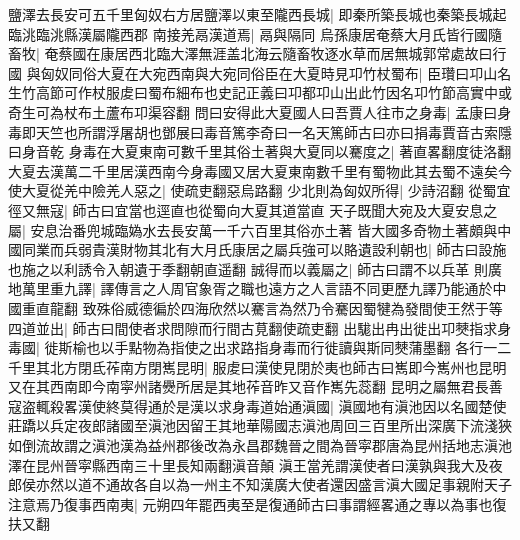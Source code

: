鹽澤去長安可五千里匈奴右方居鹽澤以東至隴西長城|{
	即秦所築長城也秦築長城起臨洮臨洮縣漢屬隴西郡}
南接羌鬲漢道焉|{
	鬲與隔同}
烏孫康居奄蔡大月氏皆行國隨畜牧|{
	奄蔡國在康居西北臨大澤無涯盖北海云隨畜牧逐水草而居無城郭常處故曰行國}
與匈奴同俗大夏在大宛西南與大宛同俗臣在大夏時見卭竹杖蜀布|{
	臣瓚曰卭山名生竹高節可作杖服䖍曰蜀布細布也史記正義曰卭都卭山出此竹因名卭竹節高實中或奇生可為杖布土蘆布卭渠容翻}
問曰安得此大夏國人曰吾賈人往市之身毒|{
	孟康曰身毒即天竺也所謂浮屠胡也鄧展曰毒音篤李奇曰一名天篤師古曰亦曰捐毒賈音古索隱曰身音乾}
身毒在大夏東南可數千里其俗土著與大夏同以騫度之|{
	著直畧翻度徒洛翻}
大夏去漢萬二千里居漢西南今身毒國又居大夏東南數千里有蜀物此其去蜀不遠矣今使大夏從羌中險羌人惡之|{
	使疏吏翻惡烏路翻}
少北則為匈奴所得|{
	少詩沼翻}
從蜀宜徑又無寇|{
	師古曰宜當也逕直也從蜀向大夏其道當直}
天子既聞大宛及大夏安息之屬|{
	安息治番兜城臨媯水去長安萬一千六百里其俗亦土著}
皆大國多奇物土著頗與中國同業而兵弱貴漢財物其北有大月氏康居之屬兵強可以賂遺設利朝也|{
	師古曰設施也施之以利誘令入朝遺于季翻朝直遥翻}
誠得而以義屬之|{
	師古曰謂不以兵革}
則廣地萬里重九譯|{
	譯傳言之人周官象胥之職也遠方之人言語不同更歷九譯乃能通於中國重直龍翻}
致殊俗威德徧於四海欣然以騫言為然乃令騫因蜀犍為發間使王然于等四道並出|{
	師古曰間使者求問隙而行間古莧翻使疏吏翻}
出駹出冉出徙出卭僰指求身毒國|{
	徙斯榆也以手點物為指使之出求路指身毒而行徙讀與斯同僰蒲墨翻}
各行一二千里其北方閉氐莋南方閉嶲昆明|{
	服䖍曰漢使見閉於夷也師古曰嶲即今嶲州也昆明又在其西南即今南寜州諸㸑所居是其地莋音昨又音作嶲先蕊翻}
昆明之屬無君長善寇盗輒殺畧漢使終莫得通於是漢以求身毒道始通滇國|{
	滇國地有滇池因以名國楚使莊蹻以兵定夜郎諸國至滇池因留王其地華陽國志滇池周回三百里所出深廣下流淺狹如倒流故謂之滇池漢為益州郡後改為永昌郡魏晉之間為晉寜郡唐為昆州括地志滇池澤在昆州晉寜縣西南三十里長知兩翻滇音顛}
滇王當羌謂漢使者曰漢孰與我大及夜郎侯亦然以道不通故各自以為一州主不知漢廣大使者還因盛言滇大國足事親附天子注意焉乃復事西南夷|{
	元朔四年罷西夷至是復通師古曰事謂經畧通之專以為事也復扶又翻}


